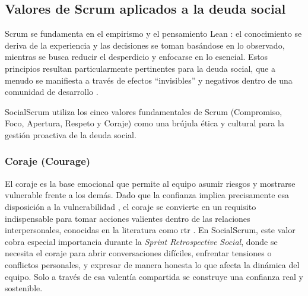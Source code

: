 \subsection{Valores de Scrum aplicados a la deuda social}

Scrum se fundamenta en el empirismo y el pensamiento Lean \cite{schwaber2020scrum}: el conocimiento se deriva de la experiencia y las decisiones se toman basándose en lo observado, mientras se busca reducir el desperdicio y enfocarse en lo esencial. Estos principios resultan particularmente pertinentes para la deuda social, que a menudo se manifiesta a través de efectos ``invisibles'' y negativos dentro de una comunidad de desarrollo \cite{saeeda2024nontechnicaldebt,caballero2022communitysmells}.

SocialScrum utiliza los cinco valores fundamentales de Scrum (Compromiso, Foco, Apertura, Respeto y Coraje) \cite{schwaber2020scrum} como una brújula ética y cultural para la gestión proactiva de la deuda social.

\subsubsection{Coraje (Courage)}
El coraje es la base emocional que permite al equipo asumir riesgos y mostrarse vulnerable frente a los demás.
Dado que la confianza implica precisamente esa disposición a la vulnerabilidad \cite{mayer_integrative_1995}, el coraje se convierte en un requisito indispensable para tomar acciones valientes dentro de las relaciones interpersonales, conocidas en la literatura como \gls{rtr} \cite{mayer_integrative_1995}.
En SocialScrum, este valor cobra especial importancia durante la \textit{Sprint Retrospective Social}, donde se necesita el coraje para abrir conversaciones difíciles, enfrentar tensiones o conflictos personales, y expresar de manera honesta lo que afecta la dinámica del equipo. Solo a través de esa valentía compartida se construye una confianza real y sostenible.

